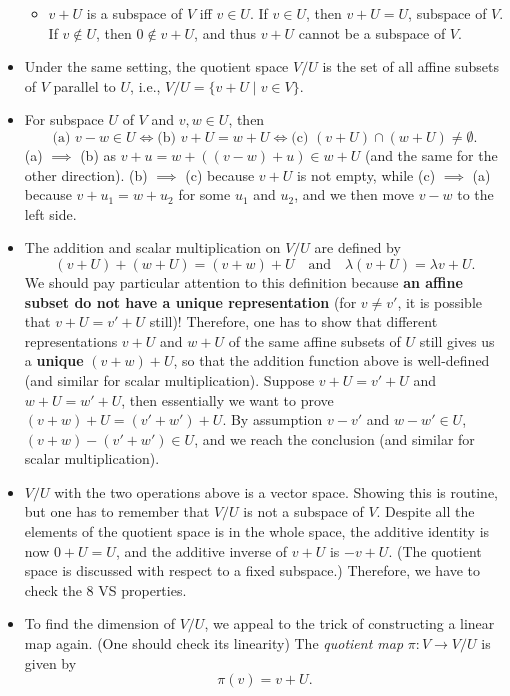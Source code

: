 \documentclass{article}
\begin{document}
\begin{itemize}
    \begin{itemize}
        \item $v+U$ is a subspace of $V$ iff $v \in U$. If $v \in U$, then $v+U = U$, subspace of $V$. If $v \notin U$, then $0 \notin v+U$, and thus $v+U$ cannot be a subspace of $V$.
    \end{itemize}
    \item Under the same setting, the quotient space $V/U$ is the set of all affine subsets of $V$ parallel to $U$, i.e., $V/U = \{v+U \mid v \in V\}$.
    \item For subspace $U$ of $V$ and $v,w \in U$, then
        \begin{equation*}
            \text{(a) } v-w \in U \iff \text{(b) } v+U = w+U \iff \text{(c) } (v+U) \cap (w+U) \not= \emptyset.
        \end{equation*}
    (a) $\implies$ (b) as $v+u = w+((v-w)+u) \in w+U$ (and the same for the other direction). (b) $\implies$ (c) because $v+U$ is not empty, while (c) $\implies$ (a) because $v+u_1=w+u_2$ for some $u_1$ and $u_2$, and we then move $v-w$ to the left side.
    \item The addition and scalar multiplication on $V/U$ are defined by  $$(v+U)+(w+U) = (v+w)+U \quad \text{and} \quad \lambda(v+U) = \lambda v + U.$$ We should pay particular attention to this definition because \textbf{an affine subset do not have a unique representation} (for $v \not= v'$, it is possible that $v+U = v'+U$ still)! Therefore, one has to show that  different representations $v+U$ and $w+U$ of the same affine subsets of $U$ still gives us a \textbf{unique} $(v+w)+U$, so that the addition function above is well-defined (and similar for scalar multiplication). Suppose $v+U = v'+U$ and $w+U = w'+U$, then essentially we want to prove $(v+w)+U=(v'+w')+U$. By assumption $v-v'$ and $w-w' \in U$, $(v+w)-(v'+w') \in U$, and we reach the conclusion (and similar for scalar multiplication).
    \item $V/U$ with the two operations above is a vector space. Showing this is routine, but one has to remember that $V/U$ is not a subspace of $V$. Despite all the elements of the quotient space is in the whole space, the additive identity is now $0+U=U$, and the additive inverse of $v+U$ is $-v+U$. (The quotient space is discussed with respect to a fixed subspace.) Therefore, we have to check the 8 VS properties.
    \item To find the dimension of $V/U$, we appeal to the trick of constructing a linear map again. (One should check its linearity) The \textit{quotient map} $\pi: V \to V/U$ is given by $$\pi(v) = v+U.$$

\end{itemize}
\end{document}
